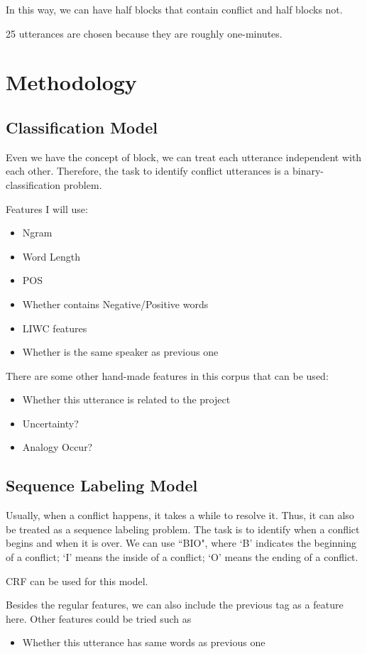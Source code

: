 \documentclass[11pt,letterpaper]{article}
\begin{document}
In this way, we can have half blocks that contain conflict and half blocks not.

25 utterances are chosen because they are roughly one-minutes.

\section{Methodology}

\subsection{Classification Model}
Even we have the concept of block, we can treat each utterance independent with each other. Therefore, the task to identify conflict utterances is a binary-classification problem.

Features I will use:

\begin{itemize}
	\item Ngram
	\item Word Length
	\item POS
	\item Whether contains Negative/Positive words
	\item LIWC features
	\item Whether is the same speaker as previous one
\end{itemize}

There are some other hand-made features in this corpus that can be used:
\begin{itemize}
	\item Whether this utterance is related to the project
	\item Uncertainty?
	\item Analogy Occur?
\end{itemize}

\subsection{Sequence Labeling Model}
Usually, when a conflict happens, it takes a while to resolve it. Thus, it can also be treated as a sequence labeling problem. The task is to identify when a conflict begins and when it is over. We can use ``BIO", where ‘B’ indicates the beginning of a conflict; ‘I’ means the inside of a conflict; ‘O’ means the ending of a conflict.

CRF \cite{Lafferty:2001} can be used for this model.

Besides the regular features, we can also include the previous tag as a feature here. Other features could be tried such as 
\begin{itemize}
	\item Whether this utterance has same words as previous one
\end{itemize}
\end{document}
